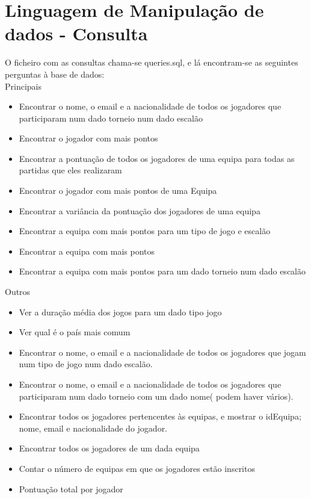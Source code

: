 \documentclass[a4paper]{article}
\begin{document}
\section{Linguagem de Manipulação de dados - Consulta}
O ficheiro com as consultas chama-se queries.sql, e lá encontram-se as seguintes perguntas à base de dados:
\\\newline
Principais
\begin{itemize}
  \item Encontrar o nome, o email e a nacionalidade de todos os jogadores que participaram num dado torneio num dado escalão
  \item Encontrar o jogador com mais pontos
  \item Encontrar a pontuação de todos os jogadores de uma equipa para todas as partidas que eles realizaram
  \item Encontrar o jogador com mais pontos de uma Equipa
  \item Encontrar a variância da pontuação dos jogadores de uma equipa
  \item Encontrar a equipa com mais pontos para um tipo de jogo e escalão
  \item Encontrar a equipa com mais pontos
  \item Encontrar a equipa com mais pontos para um dado torneio num dado escalão
\end{itemize}

Outros
\begin{itemize}
  \item Ver a duração média dos jogos para um dado tipo jogo
  \item Ver qual é o país mais comum
  \item Encontrar o nome, o email e a nacionalidade de todos os jogadores que jogam num tipo de jogo num dado escalão.
  \item Encontrar o nome, o email e a nacionalidade de todos os jogadores que participaram num dado torneio com um dado nome( podem haver vários).
  \item Encontrar todos os jogadores pertencentes às equipas, e mostrar o idEquipa; nome, email e nacionalidade do jogador.
  \item Encontrar todos os jogadores de um dada equipa
  \item Contar o número de equipas em que os jogadores estão inscritos
  \item Pontuação total por jogador
\end{itemize}
\end{document}
